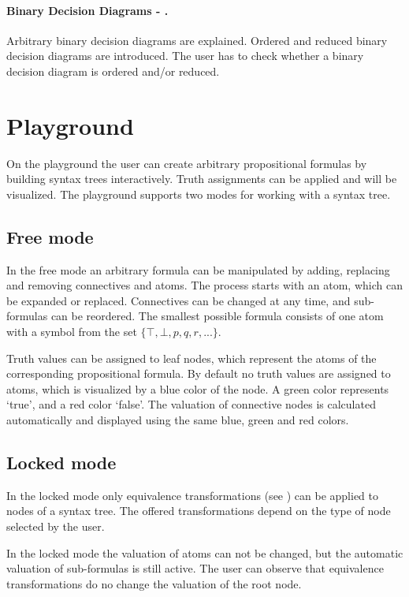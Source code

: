 \paragraph{Binary Decision Diagrams - .}
\label{tut:54}
Arbitrary binary decision diagrams are explained. 
Ordered and reduced binary decision diagrams are introduced.
The user has to check whether a binary decision diagram is ordered and/or reduced.

\newpage
\section{Playground}

On the playground the user can create arbitrary propositional formulas 
by building syntax trees interactively.
Truth assignments can be applied and will be visualized.
The playground supports two modes for working with a syntax tree.

\subsection{Free mode} 

In the free mode an arbitrary formula can be manipulated 
by adding, replacing and removing connectives and atoms. 
The process starts with an atom, which can be expanded or replaced. 
Connectives can be changed at any time, and sub-formulas can be reordered.
The smallest possible formula consists of one atom with a symbol from the set 
$\{ \top, \bot, p, q, r, ... \}$.

Truth values can be assigned to leaf nodes, 
which represent the atoms of the corresponding propositional formula. 
By default no truth values are assigned to atoms, which is visualized by a blue color of the node.
A green color represents ‘true’, and a red color ‘false’.
The valuation of connective nodes is calculated automatically 
and displayed using the same blue, green and red colors.

\subsection{Locked mode}

In the locked mode only equivalence transformations (see )
can be applied to nodes of a syntax tree.
The offered transformations depend on the type of node selected by the user. 

In the locked mode the valuation of atoms can not be changed, 
but the automatic valuation of sub-formulas is still active.
The user can observe that equivalence transformations do no change the valuation of the root node.


